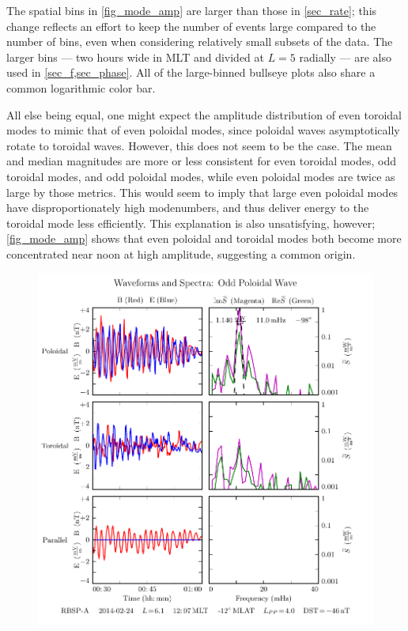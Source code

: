 The spatial bins in \cref{fig_mode_amp} are larger than those in \cref{sec_rate}; this change reflects an effort to keep the number of events large compared to the number of bins, even when considering relatively small subsets of the data. The larger bins --- two hours wide in MLT and divided at $L = 5$ radially --- are also used in \cref{sec_f,sec_phase}. All of the large-binned bullseye plots also share a common logarithmic color bar. 

All else being equal, one might expect the amplitude distribution of even toroidal modes to mimic that of even poloidal modes, since poloidal waves asymptotically rotate to toroidal waves. However, this does not seem to be the case. The mean and median magnitudes are more or less consistent for even toroidal modes, odd toroidal modes, and odd poloidal modes, while even poloidal modes are twice as large by those metrics. This would seem to imply that large even poloidal modes have disproportionately high modenumbers, and thus deliver energy to the toroidal mode less efficiently. This explanation is also unsatisfying, however; \cref{fig_mode_amp} shows that even poloidal and toroidal modes both become more concentrated near noon at high amplitude, suggesting a common origin. 

\begin{figure}[!htb]
    \centering
    \includegraphics[width=\textwidth]{figures/sample_event_strong.pdf}
    \caption[Waveforms and Spectra for a Strong Pc4 Event]{
      \todo{$\cdots$}
    }
    \label{fig_sample_event_strong}
\end{figure}

